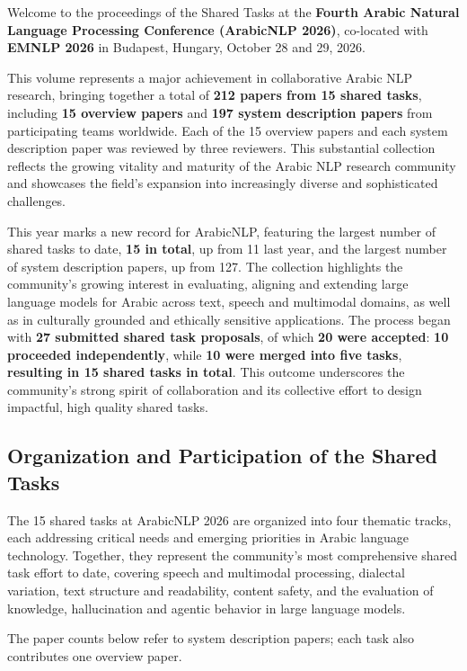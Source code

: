 Welcome to the proceedings of the Shared Tasks at the \textbf{Fourth Arabic Natural Language Processing Conference (ArabicNLP 2026)}, co-located with \textbf{EMNLP 2026} in Budapest, Hungary, October 28 and 29, 2026.

This volume represents a major achievement in collaborative Arabic NLP research, bringing together a total of \textbf{212 papers from 15 shared tasks}, including \textbf{15 overview papers} and \textbf{197 system description papers} from participating teams worldwide. Each of the 15 overview papers and each system description paper was reviewed by three reviewers. This substantial collection reflects the growing vitality and maturity of the Arabic NLP research community and showcases the field's expansion into increasingly diverse and sophisticated challenges.

This year marks a new record for ArabicNLP, featuring the largest number of shared tasks to date, \textbf{15 in total}, up from 11 last year, and the largest number of system description papers, up from 127. The collection highlights the community's growing interest in evaluating, aligning and extending large language models for Arabic across text, speech and multimodal domains, as well as in culturally grounded and ethically sensitive applications. The process began with \textbf{27 submitted shared task proposals}, of which \textbf{20 were accepted}: \textbf{10 proceeded independently}, while \textbf{10 were merged into five tasks}, \textbf{resulting in 15 shared tasks in total}. This outcome underscores the community's strong spirit of collaboration and its collective effort to design impactful, high quality shared tasks.

\subsection*{\textbf{Organization and Participation of the Shared Tasks}}

The 15 shared tasks at ArabicNLP 2026 are organized into four thematic tracks, each addressing critical needs and emerging priorities in Arabic language technology. Together, they represent the community's most comprehensive shared task effort to date, covering speech and multimodal processing, dialectal variation, text structure and readability, content safety, and the evaluation of knowledge, hallucination and agentic behavior in large language models.

The paper counts below refer to system description papers; each task also contributes one overview paper.

